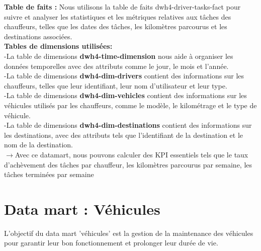 \noindent
\textbf{Table de faits :} Nous utilisons la table de faits dwh4-driver-tasks-fact pour suivre et analyser les statistiques et les métriques relatives aux tâches des chauffeurs, telles que les dates des tâches, les kilomètres parcourus et les destinations associées.\\

\noindent
\textbf{Tables de dimensions utilisées:}\\
-La table de dimensions \textbf{dwh4-time-dimension} nous aide à organiser les données temporelles avec des attributs comme le jour, le mois et l'année.\\
-La table de dimensions \textbf{dwh4-dim-drivers} contient des informations sur les chauffeurs, telles que leur identifiant, leur nom d'utilisateur et leur type.\\
-La table de dimensions \textbf{dwh4-dim-vehicles} contient des informations sur les véhicules utilisés par les chauffeurs, comme le modèle, le kilométrage et le type de véhicule.\\
-La table de dimensions \textbf{dwh4-dim-destinations} contient des informations sur les destinations, avec des attributs tels que l'identifiant de la destination et le nom de la destination.\\

$\rightarrow$Avec ce datamart, nous pouvons calculer des KPI essentiels tels que le taux d'achèvement des tâches par chauffeur, les kilomètres parcourus par semaine, les tâches terminées par semaine




\newpage
\section{Data mart : Véhicules}
L’objectif du data mart 'véhicules' est la gestion de la maintenance des véhicules pour garantir leur bon fonctionnement et prolonger leur durée de vie.

